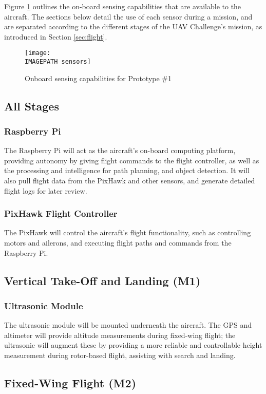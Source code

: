 \label{sec:sensing}
Figure \ref{fig:sensing} outlines the on-board sensing capabilities that are available to the aircraft. The sections below detail the use of each sensor during a mission, and are separated according to the different stages of the UAV Challenge's mission, as introduced in Section \ref{sec:flight}. 

\begin{figure}[!ht]
	\centering
	\texttt{[image: \\IMAGEPATH sensors]}
	\caption{Onboard sensing capabilities for Prototype \#1}
	\label{fig:sensing}
\end{figure}

\subsection{All Stages}
\subsubsection*{Raspberry Pi}
The Raspberry Pi will act as the aircraft's on-board computing platform, providing autonomy by giving flight commands to the flight controller, as well as the processing and intelligence for path planning, and object detection. It will also pull flight data from the PixHawk and other sensors, and generate detailed flight logs for later review.

\subsubsection*{PixHawk Flight Controller}
The PixHawk will control the aircraft's flight functionality, such as controlling motors and ailerons, and executing flight paths and commands from the Raspberry Pi.

\subsection{Vertical Take-Off and Landing (M1)}
\subsubsection*{Ultrasonic Module}
The ultrasonic module will be mounted underneath the aircraft. The GPS and altimeter will provide altitude measurements during fixed-wing flight; the ultrasonic will augment these by providing a more reliable and controllable height measurement during rotor-based flight, assisting with search and landing.

\subsection{Fixed-Wing Flight (M2)}
